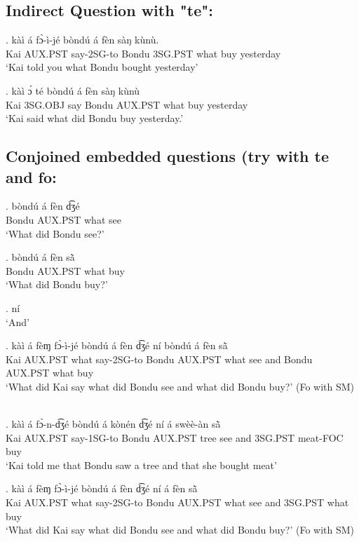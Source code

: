 \documentclass{assets/fieldnotes}
\begin{document}
\subsection{Indirect Question with "te":}

\exg. kàì á fɔ̀-ì-jé bòndú á fèn sàŋ kùnù.\\
Kai AUX.PST say-2SG-to Bondu 3SG.PST what buy yesterday\\
`Kai told you what Bondu bought yesterday' 


\exg. kàì ɔ́ té bòndú á fèn sàŋ kùnù\\
Kai 3SG.OBJ say Bondu AUX.PST what buy yesterday\\
`Kai said what did Bondu buy yesterday.' 

\subsection{Conjoined embedded questions (try with te and fo:}

\exg. bòndú á fèn d͡ʒé\\
Bondu AUX.PST what see\\
`What did Bondu see?'

\exg. bòndú á fèn sã̀\\
Bondu AUX.PST what buy\\
`What did Bondu buy?'

\ex. ní\\
`And'


\exg. kàì á fèɱ fɔ̀-ì-jé bòndú á fèn d͡ʒé ní bòndú á fèn sã̀\\
Kai AUX.PST what say-2SG-to Bondu AUX.PST what see and Bondu AUX.PST what buy\\
`What did Kai say what did Bondu see and what did Bondu buy?' (Fo with SM)

\\

\exg. kàì á fɔ̀-n-d͡ʒé bòndú á kònén d͡ʒé ní á swèè-àn sã̀\\
Kai AUX.PST say-1SG-to Bondu AUX.PST tree see and 3SG.PST meat-FOC buy\\
`Kai told me that Bondu saw a tree and that she bought meat'

\exg. kàì á fèɱ fɔ̀-ì-jé bòndú á fèn d͡ʒé ní  á fèn sã̀\\
Kai AUX.PST what say-2SG-to Bondu AUX.PST what see and 3SG.PST what buy\\
`What did Kai say what did Bondu see and what did Bondu buy?' (Fo with SM)
\end{document}
